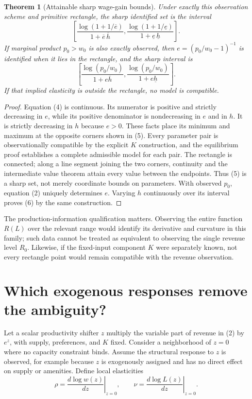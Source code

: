\documentclass[11pt]{article}
\newtheorem{theorem}{Theorem}
\theoremstyle{remark}
\begin{document}
\begin{theorem}[Attainable sharp wage-gain bounds]
Under exactly this observation scheme and primitive rectangle, the sharp
identified set is the interval
\[
 \left[
 \frac{\log(1+1/\overline e)}{1+\overline e\,\overline h},
 \frac{\log(1+1/\underline e)}{1+\underline e\,\underline h}
 \right]. \tag{5}
\]
If marginal product $p_0>w_0$ is also exactly observed, then
$e=(p_0/w_0-1)^{-1}$ is identified when it lies in the rectangle, and
the sharp interval is
\[
 \left[\frac{\log(p_0/w_0)}{1+e\overline h},
       \frac{\log(p_0/w_0)}{1+e\underline h}\right]. \tag{6}
\]
If that implied elasticity is outside the rectangle, no model is compatible.
\end{theorem}
\begin{proof}
Equation (4) is continuous. Its numerator is positive and strictly
decreasing in $e$, while its positive denominator is nondecreasing in
$e$ and in $h$. It is strictly decreasing in $h$ because $e>0$.
These facts place its minimum and maximum at the opposite corners shown
in (5). Every parameter pair is observationally compatible by the
explicit $K$ construction, and the equilibrium proof establishes a
complete admissible model for each pair. The rectangle is connected;
along a line segment joining the two corners, continuity and the
intermediate value theorem attain every value between the endpoints.
Thus (5) is a sharp set, not merely coordinate bounds on parameters.
With observed $p_0$, equation (2) uniquely determines $e$. Varying $h$
continuously over its interval proves (6) by the same construction.
\end{proof}

The production-information qualification matters. Observing the entire
function $R(L)$ over the relevant range would identify its derivative
and curvature in this family; such data cannot be treated as equivalent
to observing the single revenue level $R_0$. Likewise, if the fixed-input
component $K$ were separately known, not every rectangle point would
remain compatible with the revenue observation.

\section{Which exogenous responses remove the ambiguity?}
Let a scalar productivity shifter $z$ multiply the variable part of revenue
in (2) by $e^z$, with supply, preferences, and $K$ fixed. Consider a
neighborhood of $z=0$ where no capacity constraint binds. Assume the
structural response to $z$ is observed, for example because $z$ is
exogenously assigned and has no direct effect on supply or amenities.
Define local elasticities
\[
 \rho=\left.\frac{d\log w(z)}{dz}\right|_{z=0},\qquad
 \nu=\left.\frac{d\log L(z)}{dz}\right|_{z=0}.
\]
\end{document}
